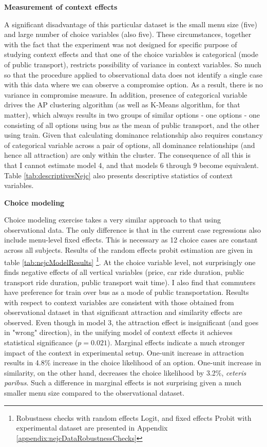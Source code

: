 \documentclass[a4paper,12pt]{article}
\begin{document}
\textbf{Measurement of context effects}

A significant disadvantage of this particular dataset is the small menu size (five) and large number of choice variables (also five). These circumstances, together with the fact that the experiment was not designed for specific purpose of studying context effects and that one of the choice variables is categorical (mode of public transport), restricts possibility of variance in context variables. So much so that the procedure applied to observational data does not identify a single case with this data where we can observe a compromise option. As a result, there is no variance in compromise measure. In addition, presence of categorical variable drives the AP clustering algorithm (as well as K-Means algorithm, for that matter), which always results in two groups of similar options - one options - one consisting of all options using bus as the mean of public transport, and the other using train. Given that calculating dominance relationship also requires constancy of categorical variable across a pair of options, all dominance relationships (and hence all attraction) are only within the cluster. The consequence of all this is that I cannot estimate model 4, and that models 6 through 9 become equivalent. Table \ref{tab:descriptivesNejc} also presents descriptive statistics of context variables.

\textbf{Choice modeling}

Choice modeling exercise takes a very similar approach to that using observational data. The only difference is that in the current case regressions also include menu-level fixed effects. This is necessary as 12 choice cases are constant across all subjects. Results of the random effects probit estimation are given in table \ref{tab:nejcModelResults} \footnote{Robustness checks with random effects Logit, and fixed effects Probit with experimental dataset are presented in Appendix \ref{appendix:nejcDataRobustnessChecks}}.  At the choice variable level, not surprisingly one finds negative effects of all vertical variables (price, car ride duration, public transport ride duration, public transport wait time). I also find that commuters have preference for train over bus as a mode of public transportation.
Results with respect to context variables are consistent with those obtained from observational dataset in that significant attraction and similarity effects are observed. Even though in model 3, the attraction effect is insignificant (and goes in "wrong" direction), in the unifying model of context effects it achieves statistical significance ($p = 0.021$). Marginal effects indicate a much stronger impact of the context in experimental setup. One-unit increase in attraction results in 4.8\% increase in the choice likelihood of an option. One-unit increase in similarity, on the other hand, decreases the choice likelihood by 3.2\%, \textit{ceteris paribus}. Such a difference in marginal effects is not surprising given a much smaller menu size compared to the observational dataset.
\end{document}
